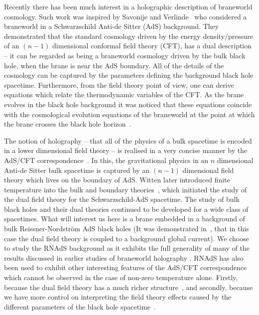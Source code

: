 \documentclass[a4paper,12pt]{article}
\begin{document}
Recently there has been much interest in a holographic description of
braneworld cosmology.  Such work was inspired by Savonije and
Verlinde~\cite{Verlinde:radiation,Savonije:braneCFT} who considered a
braneworld in a Schwarzschild Anti-de Sitter (AdS) background.  They
demonstrated that the standard cosmology driven by the energy
density/pressure of an  $(n-1)$ dimensional conformal field theory
(CFT), has a dual description -- it can be regarded as being a
braneworld cosmology driven by the bulk black hole, when the brane is
near the AdS boundary. All of the details of the cosmology can be
captured by the parameters defining the background black hole
spacetime.  Furthermore, from the field theory point of view, one can
derive equations which relate the thermodynamic variables of the CFT.
As the brane evolves in the black hole background it was noticed that
these equations coincide with the cosmological evolution equations of
the braneworld at the point at which the brane crosses the black hole
horizon~\cite{Verlinde:radiation,Savonije:braneCFT}.

The notion of holography -- that all of the physics of a bulk
spacetime is encoded in a lower dimensional field theory -- is
realised in a very concise manner by the AdS/CFT
correspondence~\cite{Maldacena:adscft,Witten:adscft,Gubser:adscft}.
In this, the gravitational physics in an $n$ dimensional Anti-de
Sitter bulk spacetime is captured by an $(n-1)$ dimensional field
theory which lives on the boundary of AdS.  Witten later introduced
finite temperature into the bulk and boundary
theories~\cite{Witten:thermal}, which initiated the study of the dual
field theory for the Schwarzschild-AdS spacetime.  The study of bulk
black holes and their dual theories continued to be developed for a
wide class of spacetimes.  What will interest us here is a brane
embedded in a background of bulk Reissner-Nordstr\"om AdS black holes
(It was demonstrated in~\cite{Chamblin:charge1}, that in this case the
dual field theory is coupled to a background global current).  We
choose to study the RNAdS background as it exhibits the full
generality of many of the results discussed in earlier studies of
braneworld holography
\cite{Csaki:cosmoconst1,Csaki:cosmoconst2,Cai:chargedcardy,Biswas:stiffmatter,Myung:branecos,Cai:chargedbg,Youm:chargedcardy,Wang:branecos,Creminelli:holography}.
RNAdS has also been used to exhibit other interesting features of the
AdS/CFT correspondence which cannot be observed in the case of
non-zero temperature alone.  Firstly, because the dual field theory
has a much richer
structure~\cite{Chamblin:charge2,Evans:superfluidity}, and secondly,
because we have more control on interpreting the field theory effects
caused by the different parameters of the black hole
spacetime~\cite{Gregory:horizons}.
\end{document}
